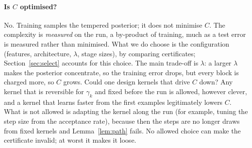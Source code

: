 \documentclass[11pt]{article}
\theoremstyle{definition}
\theoremstyle{remark}
\begin{document}
\paragraph{Is $C$ optimised?} No. Training samples the tempered posterior; it does not minimise $C$. The complexity is
\emph{measured} on the run, a by-product of training, much as a test error is measured rather than minimised. What we do
choose is the configuration (features, architecture, $\lambda$, stage sizes), by comparing certificates; Section~\ref{sec:select}
accounts for this choice. The main trade-off is $\lambda$: a larger $\lambda$ makes the posterior concentrate, so the
training error drops, but every block is charged more, so $C$ grows. Could one design kernels that drive $C$ down? Any
kernel that is reversible for $\gamma_k$ and fixed before the run is allowed, however clever, and a kernel that learns
faster from the first examples legitimately lowers $C$. What is not allowed is adapting the kernel along the run (for
example, tuning the step size from the acceptance rate), because then the steps are no longer draws from fixed kernels and
Lemma~\ref{lem:path} fails. No allowed choice can make the certificate invalid; at worst it makes it loose.
\end{document}
